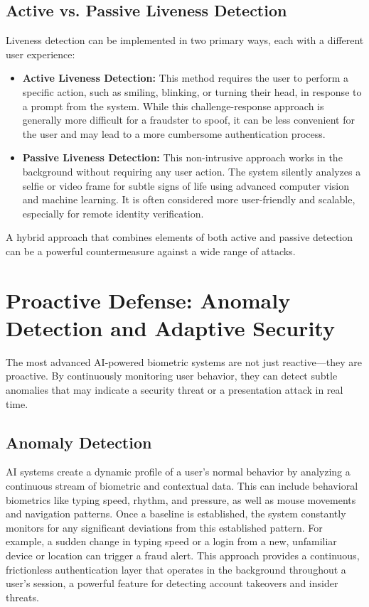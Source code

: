 \subsection{Active vs. Passive Liveness Detection}

Liveness detection can be implemented in two primary ways, each with a different user experience:

\begin{itemize}
    \item \textbf{Active Liveness Detection:} This method requires the user to perform a specific action, such as smiling, blinking, or turning their head, in response to a prompt from the system. While this challenge-response approach is generally more difficult for a fraudster to spoof, it can be less convenient for the user and may lead to a more cumbersome authentication process.
    \item \textbf{Passive Liveness Detection:} This non-intrusive approach works in the background without requiring any user action. The system silently analyzes a selfie or video frame for subtle signs of life using advanced computer vision and machine learning. It is often considered more user-friendly and scalable, especially for remote identity verification.
\end{itemize}

A hybrid approach that combines elements of both active and passive detection can be a powerful countermeasure against a wide range of attacks.

\section{Proactive Defense: Anomaly Detection and Adaptive Security}

The most advanced AI-powered biometric systems are not just reactive---they are proactive. By continuously monitoring user behavior, they can detect subtle anomalies that may indicate a security threat or a presentation attack in real time.

\subsection{Anomaly Detection}

AI systems create a dynamic profile of a user's normal behavior by analyzing a continuous stream of biometric and contextual data. This can include behavioral biometrics like typing speed, rhythm, and pressure, as well as mouse movements and navigation patterns. Once a baseline is established, the system constantly monitors for any significant deviations from this established pattern. For example, a sudden change in typing speed or a login from a new, unfamiliar device or location can trigger a fraud alert. This approach provides a continuous, frictionless authentication layer that operates in the background throughout a user's session, a powerful feature for detecting account takeovers and insider threats.

